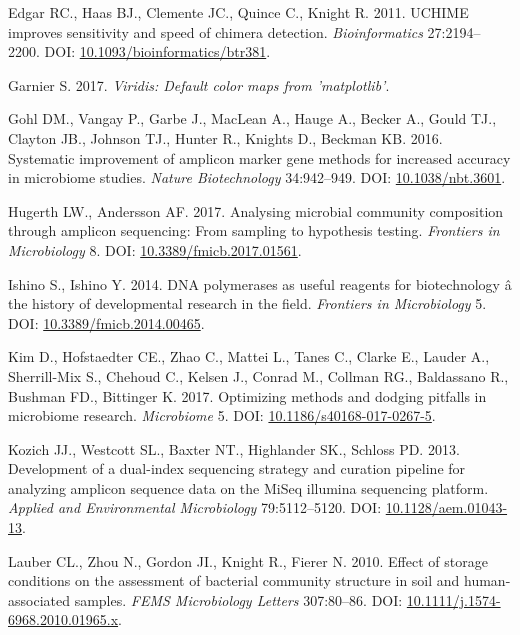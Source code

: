 \documentclass[12pt,]{article}
\begin{document}
\hypertarget{ref-uchime_Edgar_2011}{}
Edgar RC., Haas BJ., Clemente JC., Quince C., Knight R. 2011. UCHIME
improves sensitivity and speed of chimera detection.
\emph{Bioinformatics} 27:2194--2200. DOI:
\href{https://doi.org/10.1093/bioinformatics/btr381}{10.1093/bioinformatics/btr381}.

\hypertarget{ref-viridis_citation_2017}{}
Garnier S. 2017. \emph{Viridis: Default color maps from 'matplotlib'}.

\hypertarget{ref-taq_Gohl_2016}{}
Gohl DM., Vangay P., Garbe J., MacLean A., Hauge A., Becker A., Gould
TJ., Clayton JB., Johnson TJ., Hunter R., Knights D., Beckman KB. 2016.
Systematic improvement of amplicon marker gene methods for increased
accuracy in microbiome studies. \emph{Nature Biotechnology} 34:942--949.
DOI: \href{https://doi.org/10.1038/nbt.3601}{10.1038/nbt.3601}.

\hypertarget{ref-review_Hugerth_2017}{}
Hugerth LW., Andersson AF. 2017. Analysing microbial community
composition through amplicon sequencing: From sampling to hypothesis
testing. \emph{Frontiers in Microbiology} 8. DOI:
\href{https://doi.org/10.3389/fmicb.2017.01561}{10.3389/fmicb.2017.01561}.

\hypertarget{ref-polymerase_Ishino_2014}{}
Ishino S., Ishino Y. 2014. DNA polymerases as useful reagents for
biotechnology â the history of developmental research in the field.
\emph{Frontiers in Microbiology} 5. DOI:
\href{https://doi.org/10.3389/fmicb.2014.00465}{10.3389/fmicb.2014.00465}.

\hypertarget{ref-review_Kim_2017}{}
Kim D., Hofstaedter CE., Zhao C., Mattei L., Tanes C., Clarke E., Lauder
A., Sherrill-Mix S., Chehoud C., Kelsen J., Conrad M., Collman RG.,
Baldassano R., Bushman FD., Bittinger K. 2017. Optimizing methods and
dodging pitfalls in microbiome research. \emph{Microbiome} 5. DOI:
\href{https://doi.org/10.1186/s40168-017-0267-5}{10.1186/s40168-017-0267-5}.

\hypertarget{ref-protocol_Kozich_2013}{}
Kozich JJ., Westcott SL., Baxter NT., Highlander SK., Schloss PD. 2013.
Development of a dual-index sequencing strategy and curation pipeline
for analyzing amplicon sequence data on the MiSeq illumina sequencing
platform. \emph{Applied and Environmental Microbiology} 79:5112--5120.
DOI: \href{https://doi.org/10.1128/aem.01043-13}{10.1128/aem.01043-13}.

\hypertarget{ref-storage_Lauber_2010}{}
Lauber CL., Zhou N., Gordon JI., Knight R., Fierer N. 2010. Effect of
storage conditions on the assessment of bacterial community structure in
soil and human-associated samples. \emph{FEMS Microbiology Letters}
307:80--86. DOI:
\href{https://doi.org/10.1111/j.1574-6968.2010.01965.x}{10.1111/j.1574-6968.2010.01965.x}.
\end{document}
